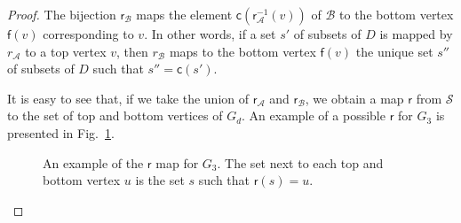 \begin{proof}
  The bijection $\mathsf{r}_\mathcal{B}$ maps the element
  $\mathsf{c}(\mathsf{r}^{-1}_\mathcal{A}(v))$ of $\mathcal{B}$ to the bottom
  vertex $\mathsf{f}(v)$ corresponding to $v$. In other words, if a set $s'$ of
  subsets of $D$ is mapped by $r_\mathcal{A}$ to a top vertex $v$, then
  $r_\mathcal{B}$ maps to the bottom vertex $\mathsf{f}(v)$ the unique set $s''$
  of subsets of $D$ such that $s''=\mathsf{c}(s')$.
  
  It is easy to see that, if we take the union of $\mathsf{r}_\mathcal{A}$ and
  $\mathsf{r}_\mathcal{B}$, we obtain a map $\mathsf{r}$ from $\mathcal{S}$ to
  the set of top and bottom vertices of $G_d$. An example of a possible
  $\mathsf{r}$ for $G_3$ is presented in Fig.~\ref{fig:mapexample}.

  \begin{figure}[ht]
    \centering
    \caption{An example of the $\mathsf{r}$ map for $G_3$. The set next to
    each top and bottom vertex $u$ is the set $s$ such that $\mathsf{r}(s)=u$.}
    \label{fig:mapexample}
  \end{figure}


\end{proof}
